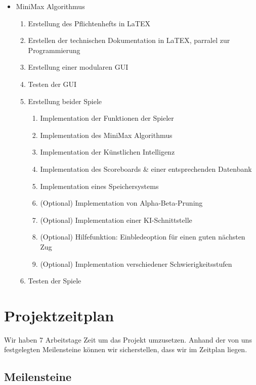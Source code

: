 \documentclass[14pt]{scrartcl}
\begin{document}
\begin{itemize}
    \item MiniMax Algorithmus
    \begin{enumerate}
        \item Erstellung des Pflichtenhefts in LaTEX
        \item Erstellen der technischen Dokumentation in LaTEX, parralel zur Programmierung
        \item Erstellung einer modularen GUI
        \item Testen der GUI
        \item Erstellung beider Spiele
        \begin{enumerate}
            \item Implementation der Funktionen der Spieler
            \item Implementation des MiniMax Algorithmus
            \item Implementation der Künstlichen Intelligenz
            \item Implementation des Scoreboards \& einer entsprechenden Datenbank
            \item Implementation eines Speichersystems
            \item (Optional) Implementation von Alpha-Beta-Pruning
            \item (Optional) Implementation einer KI-Schnittstelle
            \item (Optional) Hilfefunktion: Einbledeoption für einen guten nächsten Zug
            \item (Optional) Implementation verschiedener Schwierigkeitsstufen
        \end{enumerate}
        \item Testen der Spiele
    \end{enumerate}
\end{itemize}

\newpage
\section{Projektzeitplan}

Wir haben 7 Arbeitstage Zeit um das Projekt umzusetzen. Anhand 
der von uns festgelegten Meilensteine können wir sicherstellen, dass wir im Zeitplan liegen.\par

\subsection{Meilensteine}
\end{document}
